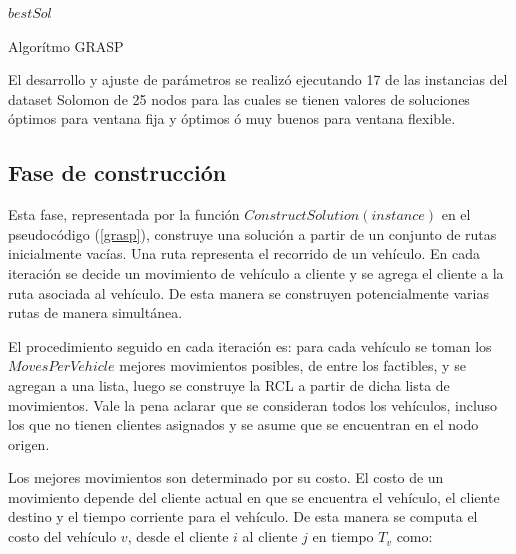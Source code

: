 \documentclass{article}
\begin{document}
  \begin{algorithm}
    \begin{algorithmic}
          \EndIf
            \EndIf
          \EndFor
          \EndIf
        \EndFor
        \State \Return $bestSol$
      \EndFunction
    \end{algorithmic}
    \caption{Algorítmo GRASP \label{grasp}}
  \end{algorithm}

  El desarrollo y ajuste de parámetros se realizó ejecutando 17 de las instancias del dataset Solomon de 25 nodos para las cuales se tienen valores de soluciones óptimos para ventana fija y óptimos ó muy buenos para ventana flexible.

  \subsection*{Fase de construcción}

  Esta fase, representada por la función $ConstructSolution(instance)$ en el pseudocódigo (\ref{grasp}), construye una solución a partir de un conjunto de rutas inicialmente vacías. Una ruta representa el recorrido de un vehículo. En cada iteración se decide un movimiento de vehículo a cliente y se agrega el cliente a la ruta asociada al vehículo. De esta manera se construyen potencialmente varias rutas de manera simultánea.

  El procedimiento seguido en cada iteración es: para cada vehículo se toman los $MovesPerVehicle$ mejores movimientos posibles, de entre los factibles, y se agregan a una lista, luego se construye la RCL a partir de dicha lista de movimientos. Vale la pena aclarar que se consideran todos los vehículos, incluso los que no tienen clientes asignados y se asume que se encuentran en el nodo origen.

  Los mejores movimientos son determinado por su costo. El costo de un movimiento depende del cliente actual en que se encuentra el vehículo, el cliente destino y el tiempo corriente para el vehículo. De esta manera se computa el costo del vehículo $v$, desde el cliente $i$ al cliente $j$ en tiempo $T_v$ como:
\end{document}
